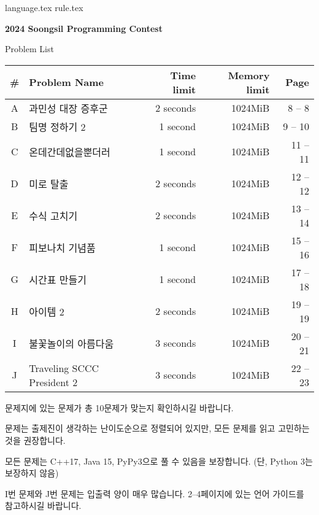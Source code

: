 \documentclass[11pt,a4paper,oneside]{article}
\begin{document}
    
%
    {language.tex} \pagebreak
    {rule.tex} \pagebreak
%
    \begin{center}
    
    \vspace*{15mm}
    {
        \Huge
        \textbf{2024 Soongsil Programming Contest}
        
        \vspace{25mm}
        Problem List
        \vspace{10mm}
    }
    
    \begin{tabular}{|c|l|r|r|r|}
    \hline
    \# & Problem Name & Time limit & Memory limit & Page \\ \hline
        A & 과민성 대장 증후군 & 2 seconds & 1024MiB & \phantom{0}8 -- \phantom{0}8 \\ \hline
        B & 팀명 정하기 2 & 1 second\phantom{s} & 1024MiB & \phantom{0}9 -- 10 \\ \hline
        C & 온데간데없을뿐더러 & 1 second\phantom{s} & 1024MiB & 11 -- 11 \\ \hline
        D & 미로 탈출 & 2 seconds & 1024MiB & 12 -- 12 \\ \hline
        E & 수식 고치기 & 2 seconds & 1024MiB & 13 -- 14 \\ \hline
        F & 피보나치 기념품 & 1 second\phantom{s} & 1024MiB & 15 -- 16 \\ \hline
        G & 시간표 만들기 & 1 second\phantom{s} & 1024MiB & 17 -- 18 \\ \hline
        H & 아이템 2 & 2 seconds & 1024MiB & 19 -- 19 \\ \hline
        I & 불꽃놀이의 아름다움 & 3 seconds & 1024MiB & 20 -- 21 \\ \hline
        J & Traveling SCCC President 2 & 3 seconds & 1024MiB & 22 -- 23 \\ \hline
    \end{tabular}

    \vspace{5mm}
    
    문제지에 있는 문제가 총 10문제가 맞는지 확인하시길 바랍니다.

    문제는 출제진이 생각하는 난이도순으로 정렬되어 있지만, 모든 문제를 읽고 고민하는 것을 권장합니다.

    모든 문제는 C++17, Java 15, PyPy3으로 풀 수 있음을 보장합니다. (단, Python 3는 보장하지 않음)

    I번 문제와 J번 문제는 입출력 양이 매우 많습니다. 2--4페이지에 있는 언어 가이드를 참고하시길 바랍니다.
    
    \end{center}
    	
\end{document}
